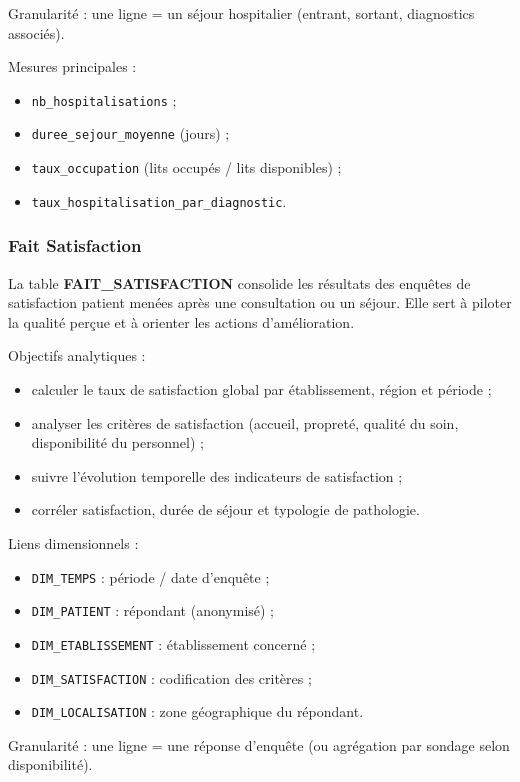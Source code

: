 \documentclass[12pt,a4paper]{article}
\begin{document}
Granularité : une ligne = un séjour hospitalier (entrant, sortant, diagnostics associés).

Mesures principales :
\begin{itemize}
    \item \texttt{nb\_hospitalisations} ;
    \item \texttt{duree\_sejour\_moyenne} (jours) ;
    \item \texttt{taux\_occupation} (lits occupés / lits disponibles) ;
    \item \texttt{taux\_hospitalisation\_par\_diagnostic}.
\end{itemize}

\subsubsection{Fait Satisfaction}

La table \textbf{FAIT\_SATISFACTION} consolide les résultats des enquêtes de satisfaction patient menées après une consultation ou un séjour. Elle sert à piloter la qualité perçue et à orienter les actions d’amélioration.

Objectifs analytiques :
\begin{itemize}
    \item calculer le taux de satisfaction global par établissement, région et période ;
    \item analyser les critères de satisfaction (accueil, propreté, qualité du soin, disponibilité du personnel) ;
    \item suivre l’évolution temporelle des indicateurs de satisfaction ;
    \item corréler satisfaction, durée de séjour et typologie de pathologie.
\end{itemize}

Liens dimensionnels :
\begin{itemize}
    \item \texttt{DIM\_TEMPS} : période / date d’enquête ;
    \item \texttt{DIM\_PATIENT} : répondant (anonymisé) ;
    \item \texttt{DIM\_ETABLISSEMENT} : établissement concerné ;
    \item \texttt{DIM\_SATISFACTION} : codification des critères ;
    \item \texttt{DIM\_LOCALISATION} : zone géographique du répondant.
\end{itemize}

Granularité : une ligne = une réponse d’enquête (ou agrégation par sondage selon disponibilité).
\end{document}
